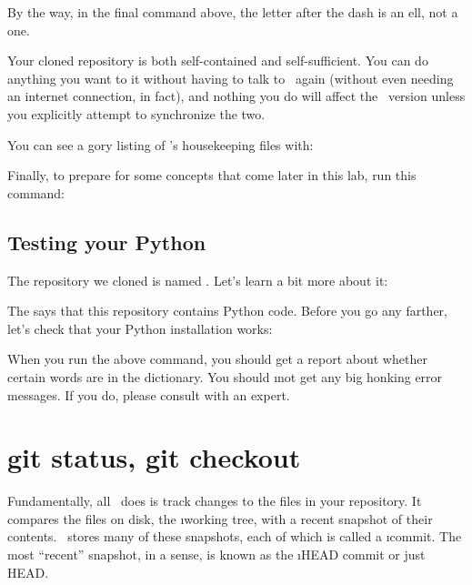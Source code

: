 \documentclass[letterpaper, 12pt, titlepage, twoside]{article}
\begin{document}
By the way, in the final command above, the letter after the dash is an ell,
not a one.


Your cloned repository is both self-contained and self-sufficient. You can do
anything you want to it without having to talk to \github\ again (without even
needing an internet connection, in fact), and nothing you do will affect the
\github\ version unless you explicitly attempt to synchronize the two.

You can see a gory listing of \git's housekeeping files with:


Finally, to prepare for some concepts that come later in this lab, run this
command:


\subsection*{Testing your Python}

The repository we cloned is named . Let's learn a bit more about
it:


The  says that this repository contains Python code. Before you go
any farther, let's check that your Python installation works:


When you run the above command, you should get a report about whether certain
words are in the dictionary. You should \i{not} get any big honking error
messages. If you do, please consult with an expert.


\section{git status, git checkout}


Fundamentally, \x all \git\ does is track changes to the files in your
repository. It compares the files on disk, the \i{working tree}, with a recent
snapshot of their contents. \git\ stores many of these snapshots, each of
which is called a \i{commit}. The most ``recent'' snapshot, in a sense, is
known as the \i{HEAD} commit or just HEAD.
\end{document}
